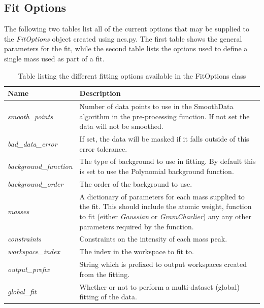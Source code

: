\documentclass[paper=a4, fontsize=11pt]{scrartcl}	%
\numberwithin{equation}{section}															%
\numberwithin{figure}{section}																%
\numberwithin{table}{section}
\begin{document}
\begin{appendices}
\section{Fit Options}
\label{sec:fit-options}
The following two tables list all of the current options that may be supplied to the \textit{FitOptions} object created using ncs.py. The first table shows the general parameters for the fit, while the second table lists the options used to define a single mass used as part of a fit.

\begin{table}[H]
\centering
\begin{tabular}{ l p{12cm}}
Name & Description \\ \hline
\textit{smooth\_points} & Number of data points to use in the SmoothData algorithm in the pre-processing function. If not set the data will not be smoothed. \\ \hline
\textit{bad\_data\_error} & If set, the data will be masked if it falls outside of this error tolerance.\\ \hline
\textit{background\_function} & The type of background to use in fitting. By default this is set to use the Polynomial background function. \\ \hline
\textit{background\_order} & The order of the background to use.\\ \hline
\textit{masses} & A dictionary of parameters for each mass supplied to the fit. This should include the atomic weight, function to fit (either \textit{Gaussian} or \textit{GramCharlier}) any any other parameters required by the function. \\ \hline
\textit{constraints} & Constraints on the intensity of each mass peak. \\ \hline
\textit{workspace\_index} & The index in the workspace to fit to. \\ \hline
\textit{output\_prefix} & String which is prefixed to output workspaces created from the fitting. \\ \hline
\textit{global\_fit} & Whether or not to perform a multi-dataset (global) fitting of the data. \\ \hline
\end{tabular}
\caption{Table listing the different fitting options available in the FitOptions class}
\label{table:fit-parameters}
\end{table}


\end{appendices}
\end{document}
